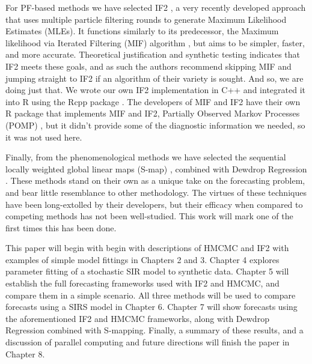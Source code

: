 For PF-based methods we have selected IF2 \cite{Ionides2015}, a very recently developed approach that uses multiple particle filtering rounds to generate Maximum Likelihood Estimates (MLEs). It functions similarly to its predecessor, the Maximum likelihood via Iterated Filtering (MIF) algorithm \cite{Ionides2006}, but aims to be simpler, faster, and more accurate. Theoretical justification and synthetic testing indicates that IF2 meets these goals, and as such the authors recommend skipping MIF and jumping straight to IF2 if an algorithm of their variety is sought. And so, we are doing just that. We wrote our own IF2 implementation in C++ and integrated it into R using the Rcpp package \cite{Eddelbuettel2011}. The developers of MIF and IF2 have their own R package that implements MIF and IF2, Partially Observed Markov Processes (POMP) \cite{King2015a}\cite{King2016}, but it didn't provide some of the diagnostic information we needed, so it was not used here.

Finally, from the phenomenological methods we have selected the sequential locally weighted global linear maps (S-map) \cite{Sugihara1994}\cite{Sugihara1990}\cite{Hsieh2008}\cite{Glaser2014}, combined with Dewdrop Regression \cite{Glaser2014}. These methods stand on their own as a unique take on the forecasting problem, and bear little resemblance to other methodology. The virtues of these techniques have been long-extolled by their developers, but their efficacy when compared to competing methods has not been well-studied. This work will mark one of the first times this has been done.

This paper will begin with begin with descriptions of HMCMC and IF2 with examples of simple model fittings in Chapters 2 and 3. Chapter 4 explores parameter fitting of a stochastic SIR model to synthetic data. Chapter 5 will establish the full forecasting frameworks used with IF2 and HMCMC, and compare them in a simple scenario. All three methods will be used to compare forecasts using a SIRS model in Chapter 6. Chapter 7 will show forecasts using the aforementioned IF2 and HMCMC frameworks, along with Dewdrop Regression combined with S-mapping. Finally, a summary of these results, and a discussion of parallel computing and future directions will finish the paper in Chapter 8.